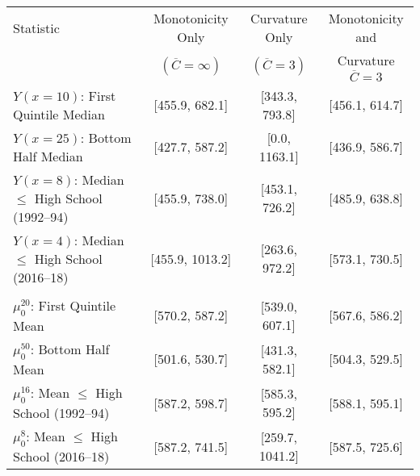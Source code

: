 \begin{tabular}{lccc}
\hline
Statistic                                    & Monotonicity Only                                 & Curvature Only                                            & Monotonicity and                                      \\
                                             & $(\overline{C}=\infty)$                           & $(\overline{C}=3)$                                        & Curvature $\overline{C}=3$                            \\
\hline
$Y(x=10)$: First Quintile Median              & [455.9, 682.1]   & [343.3, 793.8]   & [456.1, 614.7]   \\
$Y(x=25)$: Bottom Half Median                 & [427.7, 587.2]   & [0.0, 1163.1]   & [436.9, 586.7]   \\
$Y(x=8)$: Median $\le$ High School (1992--94)   & [455.9, 738.0]   & [453.1, 726.2]   & [485.9, 638.8]   \\
$Y(x=4)$: Median $\le$ High School (2016--18)   & [455.9, 1013.2]   & [263.6, 972.2]   & [573.1, 730.5]   \\
\rule{0pt}{2ex}                              &                                                   &                                                           &                                                       \\
$\mu_0^{20}$: First Quintile Mean            & [570.2, 587.2] & [539.0, 607.1] & [567.6, 586.2] \\
$\mu_0^{50}$: Bottom Half Mean               & [501.6, 530.7] & [431.3, 582.1] & [504.3, 529.5] \\
$\mu_0^{16}$: Mean $\le$ High School (1992--94) & [587.2, 598.7] & [585.3, 595.2] & [588.1, 595.1] \\
$\mu_0^{8}$: Mean $\le$ High School (2016--18) & [587.2, 741.5] & [259.7, 1041.2] & [587.5, 725.6] \\
\hline
\end{tabular}

